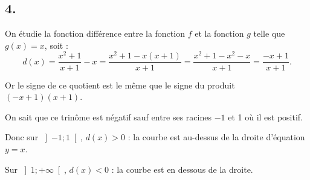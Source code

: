 \documentclass[10pt]{article}
\begin{document}
	\subsection*{4.}
	
	On étudie la fonction différence entre la fonction \(f\) et la fonction \(g\) telle que \(g(x) = x\), soit :
	\[
	d(x) = \dfrac{x^2 + 1}{x + 1} - x = \dfrac{x^2 + 1 - x(x + 1)}{x + 1} = \dfrac{x^2 + 1 - x^2 - x}{x + 1} = \dfrac{-x + 1}{x + 1}.
	\]
	
	Or le signe de ce quotient est le même que le signe du produit \((-x + 1)(x + 1)\).
	
	On sait que ce trinôme est négatif sauf entre ses racines \(-1\) et 1 où il est positif.
	
	Donc sur \(\left] -1 ; 1 \right[\), \(d(x) > 0\) : la courbe est au-dessus de la droite d'équation \(y = x\).
	
	Sur \(\left] 1 ; +\infty \right[\), \(d(x) < 0\) : la courbe est en dessous de la droite.
\end{document}
